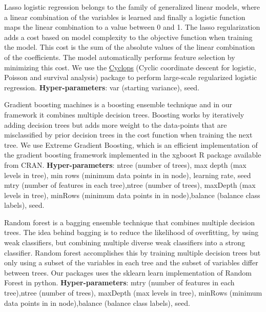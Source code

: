 \documentclass[11pt]{book}
\providecommand{\tightlist}{%
  \setlength{\itemsep}{0pt}\setlength{\parskip}{0pt}}
\begin{document}
\begin{description}
\tightlist
\item[Regularized Logistic Regression]
Lasso logistic regression belongs to the family of generalized linear
models, where a linear combination of the variables is learned and
finally a logistic function maps the linear combination to a value
between 0 and 1. The lasso regularization adds a cost based on model
complexity to the objective function when training the model. This cost
is the sum of the absolute values of the linear combination of the
coefficients. The model automatically performs feature selection by
minimizing this cost. We use the
\href{https://ohdsi.github.io/Cyclops/}{Cyclops} (Cyclic coordinate
descent for logistic, Poisson and survival analysis) package to perform
large-scale regularized logistic regression. \textbf{Hyper-parameters}:
var (starting variance), seed.
\item[Gradient boosting machines]
Gradient boosting machines is a boosting ensemble technique and in our
framework it combines multiple decision trees. Boosting works by
iteratively adding decision trees but adds more weight to the
data-points that are misclassified by prior decision trees in the cost
function when training the next tree. We use Extreme Gradient Boosting,
which is an efficient implementation of the gradient boosting framework
implemented in the xgboost R package available from CRAN.
\textbf{Hyper-parameters}: ntree (number of trees), max depth (max
levels in tree), min rows (minimum data points in in node), learning
rate, seed \textbar{} mtry (number of features in each tree),ntree
(number of trees), maxDepth (max levels in tree), minRows (minimum data
points in in node),balance (balance class labels), seed.
\item[Random forest]
Random forest is a bagging ensemble technique that combines multiple
decision trees. The idea behind bagging is to reduce the likelihood of
overfitting, by using weak classifiers, but combining multiple diverse
weak classifiers into a strong classifier. Random forest accomplishes
this by training multiple decision trees but only using a subset of the
variables in each tree and the subset of variables differ between trees.
Our packages uses the sklearn learn implementation of Random Forest in
python. \textbf{Hyper-parameters}: mtry (number of features in each
tree),ntree (number of trees), maxDepth (max levels in tree), minRows
(minimum data points in in node),balance (balance class labels), seed.
\item[K-nearest neighbors]

\end{description}
\end{document}
